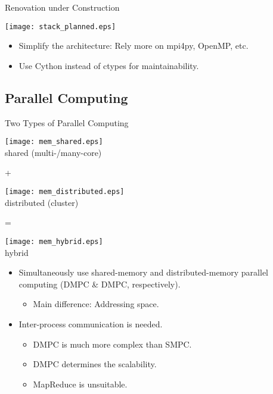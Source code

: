 \documentclass[dvips,xcolor=pst,14pt]{beamer}
\begin{document}
\begin{frame}{
%
Renovation under Construction
%
}
\begin{center}
  \parbox{\textwidth}{\centering
  \texttt{[image: stack\_planned.eps]}}
\end{center}
\begin{itemize} \footnotesize
  \item Simplify the architecture: Rely more on mpi4py, OpenMP, etc.
  \item Use Cython instead of ctypes for maintainability.
\end{itemize}
\end{frame}

\subsection{
Parallel Computing
}

\begin{frame}{
%
Two Types of Parallel Computing
%
}
\begin{minipage}[c]{\textwidth}\centering \footnotesize
\parbox{0.3\textwidth}{\centering 
\texttt{[image: mem\_shared.eps]} \\ \scriptsize shared
(multi-/many-core)}
+ 
\parbox{0.3\textwidth}{\centering
\texttt{[image: mem\_distributed.eps]} \\ \footnotesize
distributed (cluster)}
= 
\parbox{0.3\textwidth}{\centering
\texttt{[image: mem\_hybrid.eps]} \\ \footnotesize hybrid}
\end{minipage}
\begin{itemize}
  \item Simultaneously use shared-memory and distributed-memory parallel
  computing (DMPC \& DMPC, respectively).
  \begin{itemize}
    \item Main difference: \alert{Addressing space}.
  \end{itemize}
  \item Inter-process communication is needed.
  \begin{itemize}
    \item DMPC is much more complex than SMPC.
    \item \alert{DMPC determines the scalability}.
    \item \alert{MapReduce is unsuitable}.
  \end{itemize}
\end{itemize}
\end{frame}
\end{document}
